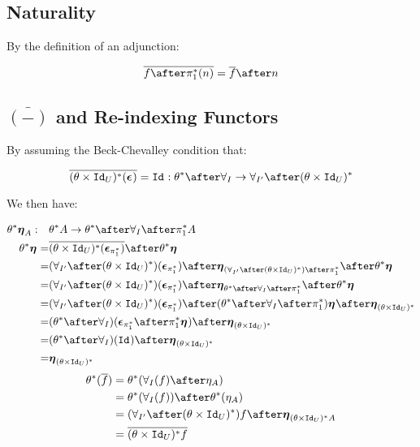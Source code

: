 \documentclass{report}
\begin{document}
    \subsection{Naturality}
    By the definition of an adjunction:
    
    \begin{equation}
        \bar{f\after\pstar(n)} = \bar{f}\after n
    \end{equation}
    
    \subsection{$\bar{(-)}$ and Re-indexing Functors}
    By assuming the Beck-Chevalley condition that:
    
    \begin{equation}
        \bar{(\theta\times\Id{U})\star(\counit{})} = \Id{}: \theta\star\after\allI \rightarrow \allII\after(\theta\times\Id{U})\star
    \end{equation}
    
    We then have:
    
    \begin{align*}
        \theta\star\unit{A}:\quad&\theta\star A \rightarrow \theta\star\after\allI\after\pstar A\\
        \theta\star\unit{} =& \bar{(\theta\times\Id{U})\star(\counit{\pstar})}\after\theta\star\unit{}\\
        =& (\allII\after(\theta\times\Id{U})\star)(\counit{\pstar})\after\unit{(\allII\after(\theta\times\Id{U})\star)\after\pstar}\after\theta\star\unit{}\\
        = & (\allII\after(\theta\times\Id{U})\star)(\counit{\pstar})\after\unit{\theta\star\after\allI\after\pstar}\after\theta\star\unit{}\\
        = & (\allII\after(\theta\times\Id{U})\star)(\counit{\pstar}) \after(\theta\star\after\allI\after\pstar)\unit{} \after\unit{(\theta\times\Id{U})\star}\\
        = & (\theta\star\after\allI)(\counit{\pstar}
        \after\pstar\unit{})\after\unit{(\theta\times\Id{U})\star}\\
        = & (\theta\star\after\allI)(\Id{})\after\unit{(\theta\times\Id{U})\star}\\
        = & \unit{(\theta\times\Id{U})\star}
    \end{align*}
    \begin{align*}
        \theta\star(\bar{f}) & = \theta\star(\allI(f)\after\eta_A)\\
        & = \theta\star(\allI(f))\after\theta\star(\eta_A)\\
        & =  (\allII\after(\theta\times\Id{U})\star)f \after\unit{(\theta\times\Id{U})\star A}\\
        & = \bar{(\theta\times\Id{U})\star f}\\
    \end{align*}
    
\end{document}
